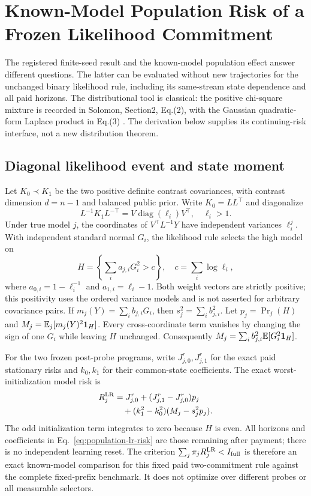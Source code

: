 \section{Known-Model Population Risk of a Frozen Likelihood Commitment}
The registered finite-seed result and the known-model population effect answer different questions.
The latter can be evaluated without new trajectories for the unchanged binary likelihood rule, including its same-stream state dependence and all paid horizons.
The distributional tool is classical: the positive chi-square mixture is recorded in Solomon, Section2, Eq.(2), with the Gaussian quadratic-form Laplace product in Eq.(3) .
The derivation below supplies its continuing-risk interface, not a new distribution theorem.

\subsection{Diagonal likelihood event and state moment}
Let $K_0\prec K_1$ be the two positive definite contrast covariances, with contrast dimension $d=n-1$ and balanced public prior.
Write $K_0=LL^\top$ and diagonalize
\[
L^{-1}K_1L^{-\top}=V\operatorname{diag}(\ell_i)V^\top,\quad \ell_i>1.
\]
Under true model $j$, the coordinates of $V^\top L^{-1}Y$ have independent variances $\ell_i^j$.
With independent standard normal $G_i$, the likelihood rule selects the high model on
\[
H=\left\{\sum_i a_{j,i}G_i^2>c\right\},\quad c=\sum_i\log\ell_i,
\]
where $a_{0,i}=1-\ell_i^{-1}$ and $a_{1,i}=\ell_i-1$.
Both weight vectors are strictly positive; this positivity uses the ordered variance models and is not asserted for arbitrary covariance pairs.
If $m_j(Y)=\sum_i b_{j,i}G_i$, then $s_j^2=\sum_i b_{j,i}^2$.
Let $p_j=\Pr_j(H)$ and $M_j=\mathbb E_j[m_j(Y)^2\mathbf1_H]$.
Every cross-coordinate term vanishes by changing the sign of one $G_i$ while leaving $H$ unchanged.
Consequently $M_j=\sum_i b_{j,i}^2\mathbb E[G_i^2\mathbf1_H]$.

For the two frozen post-probe programs, write $J_{j,0}^{r},J_{j,1}^{r}$ for the exact paid stationary risks and $k_0,k_1$ for their common-state coefficients.
The exact worst-initialization model risk is
\begin{align}
R_j^{\rm LR}&=J_{j,0}^{r}+(J_{j,1}^{r}-J_{j,0}^{r})p_j\nonumber\\
&\quad+(k_1^2-k_0^2)(M_j-s_j^2p_j).
\label{eq:population-lr-risk}
\end{align}
The odd initialization term integrates to zero because $H$ is even.
All horizons and coefficients in Eq.~\eqref{eq:population-lr-risk} are those remaining after payment; there is no independent learning reset.
The criterion $\sum_j\pi_jR_j^{\rm LR}<I_{\rm full}$ is therefore an exact known-model comparison for this fixed paid two-commitment rule against the complete fixed-prefix benchmark.
It does not optimize over different probes or all measurable selectors.

